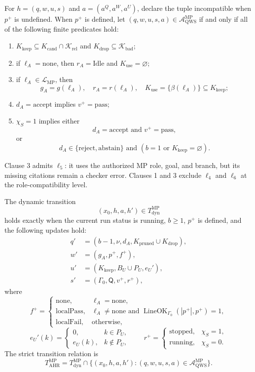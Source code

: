 \documentclass[11pt,oneside]{book}
\theoremstyle{remark}
\newcommand{\AQWS}{\mathcal A_{\mathrm{QWS}}}
\begin{document}
For $h=(q,w,u,s)$ and $a=(a^Q,a^W,a^U)$, declare the tuple incompatible when
$p^+$ is undefined. When $p^+$ is defined, let
$(q,w,u,s,a)\in\AQWS^{\mathrm{MP}}$ if and only if all of the following
finite predicates hold:
\begin{enumerate}
  \item $K_{\mathrm{keep}}\subseteq
  K_{\mathrm{cand}}\cap\mathcal K_{\mathrm{rel}}$ and
  $K_{\mathrm{drop}}\subseteq\mathcal K_{\mathrm{bad}}$;
  \item if $\ell_A=\mathrm{none}$, then
  $r_A=\mathrm{Idle}$ and $K_{\mathrm{use}}=\varnothing$;
  \item if $\ell_A\in\mathcal L_{\mathrm{MP}}$, then
  \[
  g_A=g(\ell_A),\quad
  r_A=r(\ell_A),\quad
  K_{\mathrm{use}}=\{\beta(\ell_A)\}
  \subseteq K_{\mathrm{keep}};
  \]
  \item $d_A=\mathrm{accept}$ implies $v^+=\mathrm{pass}$;
  \item $\chi_S=1$ implies either
  \[
  d_A=\mathrm{accept}\text{ and }v^+=\mathrm{pass},
  \]
  or
  \[
  d_A\in\{\mathrm{reject},\mathrm{abstain}\}
  \text{ and }(b=1\text{ or }K_{\mathrm{keep}}=\varnothing).
  \]
\end{enumerate}
Clause 3 admits $\ell_5$: it uses the authorized MP role, goal, and branch,
but its missing citations remain a checker error. Clauses 1 and 3 exclude
$\ell_4$ and $\ell_6$ at the role-compatibility level.

The dynamic transition
\[
(x_0,h,a,h')\in T_{\mathrm{dyn}}^{\mathrm{MP}}
\]
holds exactly when the current run status is $\mathrm{running}$, $b\ge1$,
$p^+$ is defined, and the following updates hold:
\begin{align*}
q'&=(b-1,\nu,d_A,K_{\mathrm{pruned}}\cup K_{\mathrm{drop}}),\\
w'&=(g_A,p^+,f^+),\\
u'&=(K_{\mathrm{keep}},B_U\cup P_U,e_U'),\\
s'&=(\Gamma_0,\mathsf Q,v^+,r^+),
\end{align*}
where
\[
f^+=
\begin{cases}
\mathrm{none},&\ell_A=\mathrm{none},\\
\mathrm{localPass},&
\ell_A\ne\mathrm{none}\text{ and }
\operatorname{LineOK}_{\Gamma_0}(|p^+|,p^+)=1,\\
\mathrm{localFail},&\text{otherwise},
\end{cases}
\]
\[
e_U'(k)=
\begin{cases}
0,&k\in P_U,\\
e_U(k),&k\notin P_U,
\end{cases}
\qquad
r^+=
\begin{cases}
\mathrm{stopped},&\chi_S=1,\\
\mathrm{running},&\chi_S=0.
\end{cases}
\]
The strict transition relation is
\[
T_{\mathrm{AHR}}^{\mathrm{MP}}
=T_{\mathrm{dyn}}^{\mathrm{MP}}\cap
\{(x_0,h,a,h'):(q,w,u,s,a)\in\AQWS^{\mathrm{MP}}\}.
\]
\end{document}
